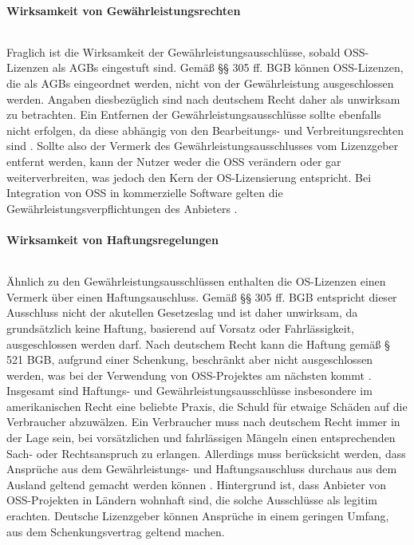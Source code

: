 \paragraph{Wirksamkeit von Gewährleistungsrechten}$~$

Fraglich ist die Wirksamkeit der Gewährleistungsausschlüsse, sobald OSS-Lizenzen als AGBs eingestuft sind. Gemäß §§ 305 ff. BGB können OSS-Lizenzen, die als AGBs eingeordnet werden, nicht von der Gewährleistung ausgeschlossen werden. Angaben diesbezüglich sind nach deutschem Recht daher als unwirksam zu betrachten. Ein Entfernen der Gewährleistungsausschlüsse sollte ebenfalls nicht erfolgen, da diese abhängig von den Bearbeitungs- und Verbreitungsrechten sind \cite[S. 71]{bitkom_open_2016}. Sollte also der Vermerk des Gewährleistungsausschlusses vom Lizenzgeber entfernt werden, kann der Nutzer weder die OSS verändern oder gar weiterverbreiten, was jedoch den Kern der OS-Lizensierung entspricht. Bei Integration von OSS in kommerzielle Software gelten die Gewährleistungsverpflichtungen des Anbieters \cite[S. 71]{bitkom_open_2016}.

\paragraph{Wirksamkeit von Haftungsregelungen}$~$

Ähnlich zu den Gewährleistungsausschlüssen enthalten die OS-Lizenzen einen Vermerk über einen Haftungsauschluss. Gemäß §§ 305 ff. BGB entspricht dieser Ausschluss nicht der akutellen Gesetzeslag und ist daher unwirksam, da grundsätzlich keine Haftung, basierend auf Vorsatz oder Fahrlässigkeit, ausgeschlossen werden darf. Nach deutschem Recht kann die Haftung gemäß § 521 BGB, aufgrund einer Schenkung, beschränkt aber nicht ausgeschlossen werden, was bei der Verwendung von OSS-Projektes am nächsten kommt \cite[S. 71]{bitkom_open_2016}. \\

Insgesamt sind Haftungs- und Gewährleistungsausschlüsse insbesondere im amerikanischen Recht eine beliebte Praxis, die Schuld für etwaige Schäden auf die Verbraucher abzuwälzen. Ein Verbraucher muss nach deutschem Recht immer in der Lage sein, bei vorsätzlichen und fahrlässigen Mängeln einen entsprechenden Sach- oder Rechtsanspruch zu erlangen. Allerdings muss berücksicht werden, dass Ansprüche aus dem Gewährleistungs- und Haftungsauschluss durchaus aus dem Ausland geltend gemacht werden können \cite[S. 48]{schaaf_open-source-lizenzen_2013}. Hintergrund ist, dass Anbieter von OSS-Projekten in Ländern wohnhaft sind, die solche Ausschlüsse als legitim erachten. Deutsche Lizenzgeber können Ansprüche in einem geringen Umfang, aus dem Schenkungsvertrag geltend machen. 

